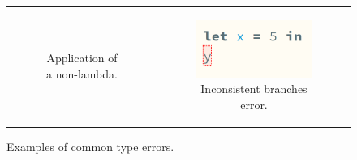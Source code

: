 \begin{figure}[htbp]
\begin{tabular}[b]{cc}
\begin{subfigure}[b]{0.3\columnwidth}
      \caption{Application of a non-lambda.}
      \label{fig:calculus-examples-app-non-lambda}
    \end{subfigure}
    &
    \begin{subfigure}[b]{0.3\columnwidth}
      \includegraphics[width=\columnwidth]{images/haz3l-unbound-variable.png}
      \caption{Inconsistent branches error.}
      \label{fig:calculus-examples-inconsistent-branches}
    \end{subfigure}
  \end{tabular}
  \caption{Examples of common type errors.}
  \label{fig:calculus-examples}
\end{figure}
